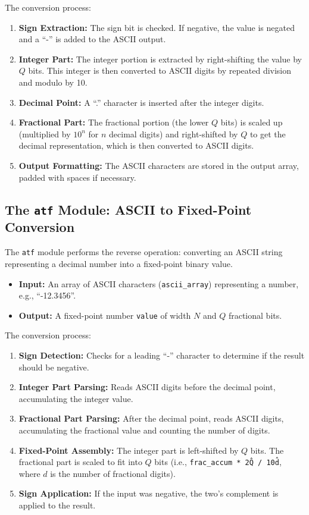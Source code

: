 \documentclass[conference]{IEEEtran}
\begin{document}
\begin{FlushLeft}
The conversion process:
\begin{enumerate}
    \item \textbf{Sign Extraction:} The sign bit is checked. If negative, the value is negated and a ``-'' is added to the ASCII output.
    \item \textbf{Integer Part:} The integer portion is extracted by right-shifting the value by $Q$ bits. This integer is then converted to ASCII digits by repeated division and modulo by 10.
    \item \textbf{Decimal Point:} A ``.'' character is inserted after the integer digits.
    \item \textbf{Fractional Part:} The fractional portion (the lower $Q$ bits) is scaled up (multiplied by $10^n$ for $n$ decimal digits) and right-shifted by $Q$ to get the decimal representation, which is then converted to ASCII digits.
    \item \textbf{Output Formatting:} The ASCII characters are stored in the output array, padded with spaces if necessary.
\end{enumerate}

\subsection{The \texttt{atf} Module: ASCII to Fixed-Point Conversion}

The \texttt{atf} module performs the reverse operation: converting an ASCII string representing a decimal number into a fixed-point binary value.

\begin{itemize}
    \item \textbf{Input:} An array of ASCII characters (\texttt{ascii\_array}) representing a number, e.g., ``-12.3456''.
    \item \textbf{Output:} A fixed-point number \texttt{value} of width $N$ and $Q$ fractional bits.
\end{itemize}

The conversion process:
\begin{enumerate}
    \item \textbf{Sign Detection:} Checks for a leading ``-'' character to determine if the result should be negative.
    \item \textbf{Integer Part Parsing:} Reads ASCII digits before the decimal point, accumulating the integer value.
    \item \textbf{Fractional Part Parsing:} After the decimal point, reads ASCII digits, accumulating the fractional value and counting the number of digits.
    \item \textbf{Fixed-Point Assembly:} The integer part is left-shifted by $Q$ bits. The fractional part is scaled to fit into $Q$ bits (i.e., \texttt{frac\_accum * 2\^Q / 10\^d}, where $d$ is the number of fractional digits).
    \item \textbf{Sign Application:} If the input was negative, the two's complement is applied to the result.
\end{enumerate}


\end{FlushLeft}
\end{document}
